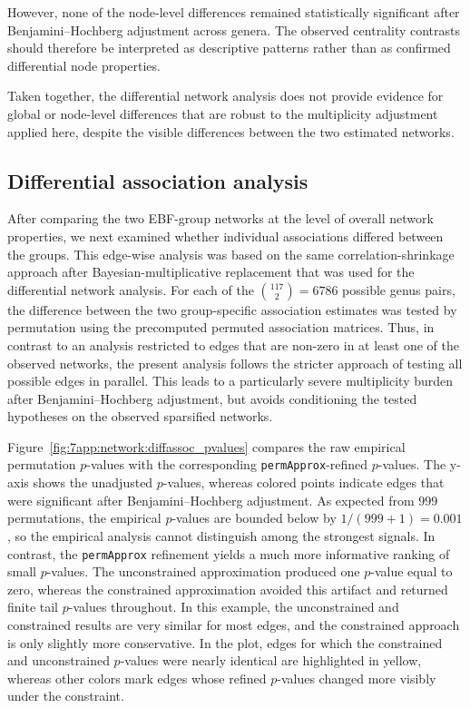 However, none of the node-level differences remained statistically significant after Benjamini--Hochberg adjustment across genera. The observed centrality contrasts should therefore be interpreted as descriptive patterns rather than as confirmed differential node properties. 

Taken together, the differential network analysis does not provide evidence for global or node-level differences that are robust to the multiplicity adjustment applied here, despite the visible differences between the two estimated networks.

\subsection{Differential association analysis}
\label{sec:7app:network:comparison:associations}

After comparing the two EBF-group networks at the level of overall network properties, we next examined whether individual associations differed between the groups. This edge-wise analysis was based on the same correlation-shrinkage approach after Bayesian-multiplicative replacement that was used for the differential network analysis. For each of the $\binom{117}{2}=6786$ possible genus pairs, the difference between the two group-specific association estimates was tested by permutation using the precomputed permuted association matrices. Thus, in contrast to an analysis restricted to edges that are non-zero in at least one of the observed networks, the present analysis follows the stricter approach of testing all possible edges in parallel. This leads to a particularly severe multiplicity burden after Benjamini--Hochberg adjustment, but avoids conditioning the tested hypotheses on the observed sparsified networks.

Figure~\ref{fig:7app:network:diffassoc_pvalues} compares the raw empirical permutation $p$-values with the corresponding \texttt{permApprox}-refined $p$-values. The y-axis shows the unadjusted $p$-values, whereas colored points indicate edges that were significant after Benjamini--Hochberg adjustment. As expected from $999$ permutations, the empirical $p$-values are bounded below by $1/(999+1)=0.001$, so the empirical analysis cannot distinguish among the strongest signals. In contrast, the \texttt{permApprox} refinement yields a much more informative ranking of small $p$-values. The unconstrained approximation produced one $p$-value equal to zero, whereas the constrained approximation avoided this artifact and returned finite tail $p$-values throughout. In this example, the unconstrained and constrained results are very similar for most edges, and the constrained approach is only slightly more conservative. In the plot, edges for which the constrained and unconstrained $p$-values were nearly identical are highlighted in yellow, whereas other colors mark edges whose refined $p$-values changed more visibly under the constraint.

